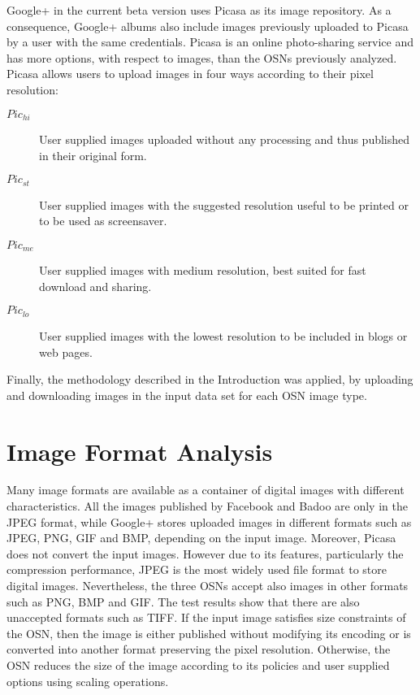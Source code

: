 \documentclass[10pt, conference]{IEEEtran}
\begin{document}
Google+ in the current beta version uses Picasa as its image repository. As a consequence, Google+ albums also include images previously uploaded to Picasa by a user with the same credentials. Picasa is an online photo-sharing service and has more options, with respect to images, than the OSNs previously analyzed. Picasa allows users to upload images in four ways according to their pixel resolution:
\begin{description}
\item [$Pic_{hi}$] User supplied images uploaded without any processing and thus published in their original form.
\item [$Pic_{st}$] User supplied images with the suggested resolution useful to be printed or to be used as screensaver.
\item [$Pic_{me}$] User supplied images with medium resolution, best suited for fast download and sharing.
\item [$Pic_{lo}$] User supplied images with the lowest resolution to be included in blogs or web pages.
\end{description}

Finally, the methodology described in the Introduction was applied, by uploading and downloading images in the input data set for each OSN image type. 


\section{Image Format Analysis}
\label{sec2}

Many image formats are available as a container of digital images with different characteristics.
All the images published by Facebook and Badoo are only in the JPEG format, while Google+ stores uploaded images in different formats such as JPEG, PNG, GIF and BMP, depending on the input image. Moreover, Picasa does not convert the input images.
However due to its features, particularly the compression performance, JPEG is the most widely used file format to store digital images.
Nevertheless, the three OSNs accept also images in other formats such as PNG, BMP and GIF. The test results show that there are also unaccepted formats such as TIFF. 
If the input image satisfies size constraints of the OSN, then the image is either published without modifying its encoding or is converted into another format preserving the pixel resolution. Otherwise, the OSN reduces the size of the image according to its policies and user supplied options using scaling operations.
\end{document}
